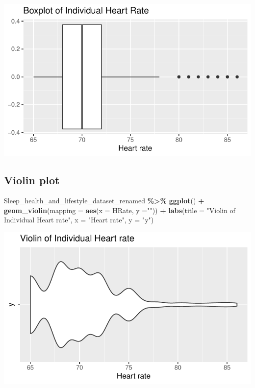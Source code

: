 \documentclass[
  11pt,
]{article}
\newenvironment{Shaded}{\begin{snugshade}}{\end{snugshade}}
\newcommand{\AttributeTok}[1]{\textcolor[rgb]{0.13,0.29,0.53}{#1}}
\newcommand{\FunctionTok}[1]{\textcolor[rgb]{0.13,0.29,0.53}{\textbf{#1}}}
\newcommand{\NormalTok}[1]{#1}
\newcommand{\SpecialCharTok}[1]{\textcolor[rgb]{0.81,0.36,0.00}{\textbf{#1}}}
\newcommand{\StringTok}[1]{\textcolor[rgb]{0.31,0.60,0.02}{#1}}
\begin{document}
\begin{center}\includegraphics[width=0.7\linewidth]{SleepHelath_files/figure-latex/unnamed-chunk-41-1} \end{center}

\hypertarget{violin-plot}{%
\subsection{Violin plot}\label{violin-plot}}

\begin{Shaded}
\begin{Highlighting}[]
\NormalTok{Sleep\_health\_and\_lifestyle\_dataset\_renamed }\SpecialCharTok{\%\textgreater{}\%}
  \FunctionTok{ggplot}\NormalTok{() }\SpecialCharTok{+}
    \FunctionTok{geom\_violin}\NormalTok{(}\AttributeTok{mapping =} \FunctionTok{aes}\NormalTok{(}\AttributeTok{x =}\NormalTok{ HRate, }\AttributeTok{y =}\StringTok{""}\NormalTok{)) }\SpecialCharTok{+}
    \FunctionTok{labs}\NormalTok{(}\AttributeTok{title =} \StringTok{"Violin of Individual Heart rate"}\NormalTok{, }\AttributeTok{x =} \StringTok{"Heart rate"}\NormalTok{, }\AttributeTok{y =} \StringTok{"y"}\NormalTok{)}
\end{Highlighting}
\end{Shaded}

\begin{center}\includegraphics[width=0.7\linewidth]{SleepHelath_files/figure-latex/unnamed-chunk-42-1} \end{center}
\end{document}
